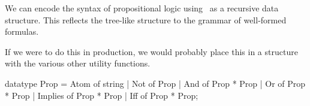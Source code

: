 \begin{node}\label{prop-000G}%
We can encode the syntax of propositional logic using \SML\ as a
recursive data structure. This reflects the tree-like structure to the
grammar of well-formed formulas.

If we were to do this in production, we would probably place this in a
structure with the various other utility functions.

\begin{sml}
datatype Prop = Atom of string
  | Not of Prop
  | And of Prop * Prop
  | Or of Prop * Prop
  | Implies of Prop * Prop
  | Iff of Prop * Prop;
\end{sml}
\end{node}

